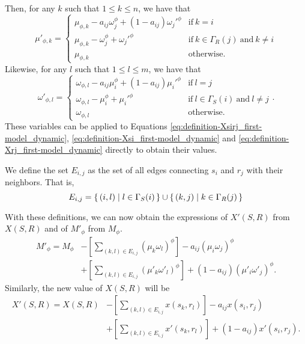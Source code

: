 Then, for any $k$ such that $1 \leq k \leq n$, we have that
\begin{equation}
  \label{eq:definition-muphik_dynamic}
  \mu'_{\phi,k} = \begin{cases}
    \mu_{\phi,k} - a_{ij} \omega_j^\phi + (1 - a_{ij}) {\omega_j'}^\phi & \text{if}~k=i \\
    \mu_{\phi,k} - \omega_j^\phi + {\omega_j'}^\phi & \text{if}~k \in \Gamma_R(j)~\text{and}~k \neq i \\
    \mu_{\phi,k} & \text{otherwise}.
  \end{cases}
\end{equation}
Likewise, for any $l$ such that $1 \leq l \leq m$, we have that
\begin{equation}
  \label{eq:definition-wphik_dynamic}
  \omega'_{\phi,l} = \begin{cases}
    \omega_{\phi,l} - a_{ij} \mu_i^\phi + (1 - a_{ij}) {\mu_i'}^\phi & \text{if}~l=j \\
    \omega_{\phi,l} - \mu_i^\phi + {\mu_i'}^\phi & \text{if}~l \in \Gamma_S(i)~\text{and}~l \neq j \\
    \omega_{\phi,l} & \text{otherwise}.
  \end{cases}.
\end{equation}
These variables can be applied to Equations \eqref{eq:definition-Xsirj_first-model_dynamic}, \eqref{eq:definition-Xsi_first-model_dynamic} and \eqref{eq:definition-Xrj_first-model_dynamic} directly to obtain their values.

We define the set $E_{i,j}$ as the set of all edges connecting $s_i$ and $r_j$ with their neighbors.
That is,
\begin{equation}
  \label{eq:definition-Nij}
  E_{i,j} = \{\,(i,l)\mid l \in \Gamma_S(i)\,\} \cup \{\,(k,j)\mid k \in \Gamma_R(j)\,\}
\end{equation}

With these definitions, we can now obtain the expressions of $X'(S,R)$ from $X(S,R)$ and of $M'_\phi$ from $M_\phi$.
\begin{equation*}
\begin{split}
  M'_{\phi} = M_\phi &- \left[ \sum_{(k,l) \in E_{i,j}}(\mu_k \omega_l)^\phi \right]   - a_{ij} (\mu_i \omega_j)^\phi \\
                     &+ \left[ \sum_{(k,l) \in E_{i,j}}(\mu'_k \omega'_l)^\phi \right] + (1 - a_{ij}) (\mu'_i \omega'_j)^\phi.
\end{split}
\end{equation*}
Similarly, the new value of $X(S,R)$ will be
\begin{equation}
  \label{eq:definition-XSR_first-model_dynamic}
\begin{split}
  X'(S,R) = X(S,R) &- \left[ \sum_{(k,l) \in E_{i,j}}x(s_k, r_l) \right] - a_{ij} x(s_i, r_j) \\
                   &+ \left[ \sum_{(k,l) \in E_{i,j}}x'(s_k, r_l)\right] + (1 - a_{ij}) x'(s_i, r_j).
\end{split}
\end{equation}

